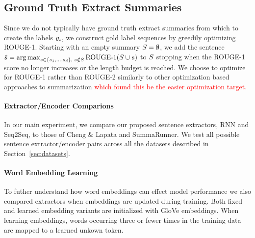 \subsection{Ground Truth Extract Summaries} 
Since we do not typically have ground truth extract summaries from which to
create the labels $\slabel_i$, we construct gold label sequences 
by greedily optimizing ROUGE-1. Starting with an empty summary $\summary = 
\null \emptyset$, we add the sentence $\hat{\sent} = 
{\argmax}_{ \sent \in \{\sent_1, \ldots, \sent_{\docsize}\},
\; \sent \notin \summary} \operatorname{ROUGE-1}(\summary \cup \sent)$
to $S$ stopping when the ROUGE-1 score no longer increases or the 
length budget is reached. We choose to optimize for ROUGE-1 rather than 
ROUGE-2 similarly to other optimization based approaches to summarization 
\textcolor{red}{
\cite{durrett2016learning,sipos2012large,nallapati2017summarunner} which found this
be the easier optimization target.}







\paragraph{Extractor/Encoder Comparions}{
In our main experiment, we compare our proposed 
sentence extractors, RNN and Seq2Seq,
to those of Cheng \& Lapata and SummaRunner.
We test all possible sentence extractor/encoder pairs across all the datasets
described in Section~\ref{sec:datasets}.} 


\paragraph{Word Embedding Learning}{To futher understand how word 
embeddings 
can
effect model performance we also compared extractors when embeddings 
are updated during training. Both fixed and learned embedding variants are 
initialized with GloVe embeddings. When learning embeddings, words occurring 
three or fewer times in the training data are mapped to a learned unkown
token.}

